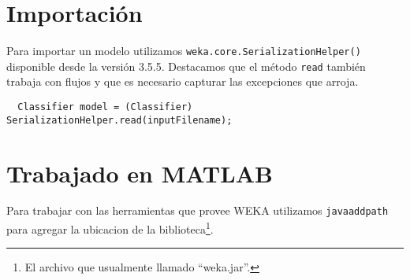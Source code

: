 \documentclass[10pt,a4paper]{article}
\begin{document}
\section{Importación}
Para importar un modelo utilizamos \lstinline{weka.core.SerializationHelper()} disponible desde la versión 3.5.5. Destacamos que el método \lstinline{read} también trabaja con flujos y que es necesario capturar las excepciones que arroja.
\begin{lstlisting}
  Classifier model = (Classifier) SerializationHelper.read(inputFilename);
\end{lstlisting}

\section{Trabajado en MATLAB}
Para trabajar con las herramientas que provee WEKA utilizamos \lstinline{javaaddpath} para agregar la ubicacion de la biblioteca\footnote{El archivo que usualmente llamado ``weka.jar''.}.
\printbibliography
\end{document}
